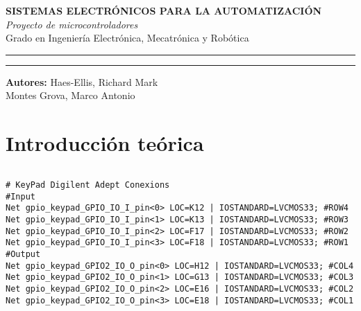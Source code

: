 \documentclass[a4paper,twoside]{article}
\begin{document}
\begin{titlepage}
	\centering
\Huge{\textbf{SISTEMAS ELECTRÓNICOS PARA LA AUTOMATIZACIÓN}} \\
\Huge{\textit{Proyecto de microcontroladores}}\\

\vspace{1cm}
\LARGE{Grado en Ingeniería Electrónica, Mecatrónica y Robótica}\\
\rule{\textwidth}{0.1mm}

\vspace{2cm}
\rule{\textwidth}{0.1mm}
\Large{\textbf{Autores:} Haes-Ellis, Richard Mark\\
			Montes Grova, Marco Antonio}
\end{titlepage}
\tableofcontents
\newpage

\section{Introducción teórica}

\begin{lstlisting}[language=C,style=CStyle, caption={Declaración e inicialización de variables}]

\end{lstlisting}

\begin{verbatim}
# KeyPad Digilent Adept Conexions
#Input
Net gpio_keypad_GPIO_IO_I_pin<0> LOC=K12 | IOSTANDARD=LVCMOS33; #ROW4
Net gpio_keypad_GPIO_IO_I_pin<1> LOC=K13 | IOSTANDARD=LVCMOS33; #ROW3
Net gpio_keypad_GPIO_IO_I_pin<2> LOC=F17 | IOSTANDARD=LVCMOS33; #ROW2
Net gpio_keypad_GPIO_IO_I_pin<3> LOC=F18 | IOSTANDARD=LVCMOS33; #ROW1
#Output
Net gpio_keypad_GPIO2_IO_O_pin<0> LOC=H12 | IOSTANDARD=LVCMOS33; #COL4
Net gpio_keypad_GPIO2_IO_O_pin<1> LOC=G13 | IOSTANDARD=LVCMOS33; #COL3
Net gpio_keypad_GPIO2_IO_O_pin<2> LOC=E16 | IOSTANDARD=LVCMOS33; #COL2
Net gpio_keypad_GPIO2_IO_O_pin<3> LOC=E18 | IOSTANDARD=LVCMOS33; #COL1
\end{verbatim}
\end{document}
